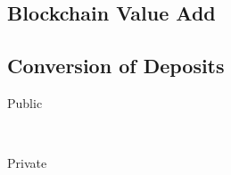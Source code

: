 \subsection{Blockchain Value Add}

\subsection{Conversion of Deposits}
\begin{description}
	\item[Public]
	\hfill \\
	
	\item[Private]
	\hfill \\
	
\end{description}

